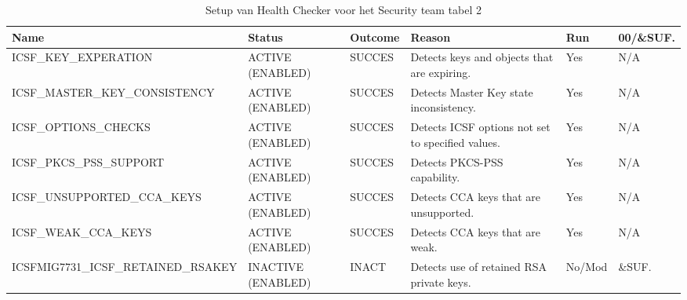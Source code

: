 \begin{landscape}
	\begin{table}[h]
		\begin{tabular}{|l|p{2.3cm}|l|p{4.5cm}|l|l|}
			\hline
			\textbf{Name}                       & \textbf{Status}   & \textbf{Outcome} & \textbf{Reason}    & \textbf{Run} &	\textbf{00/\&SUF.} \\ \hline
			ICSF\_KEY\_EXPERATION               & ACTIVE (ENABLED)   & SUCCES & Detects   keys and objects that are expiring.       & Yes    & N/A    \\ \hline
			ICSF\_MASTER\_KEY\_CONSISTENCY      & ACTIVE (ENABLED)   & SUCCES & Detects   Master Key state inconsistency.           & Yes    & N/A    \\ \hline
			ICSF\_OPTIONS\_CHECKS               & ACTIVE (ENABLED)   & SUCCES & Detects   ICSF options not set to specified values. & Yes    & N/A    \\ \hline
			ICSF\_PKCS\_PSS\_SUPPORT            & ACTIVE (ENABLED)   & SUCCES & Detects   PKCS-PSS capability.                      & Yes    & N/A    \\ \hline
			ICSF\_UNSUPPORTED\_CCA\_KEYS        & ACTIVE (ENABLED)   & SUCCES & Detects   CCA keys that are unsupported.            & Yes    & N/A    \\ \hline
			ICSF\_WEAK\_CCA\_KEYS               & ACTIVE (ENABLED)   & SUCCES & Detects   CCA keys that are weak.                   & Yes    & N/A    \\ \hline
			ICSFMIG7731\_ICSF\_RETAINED\_RSAKEY & INACTIVE (ENABLED) & INACT  & Detects use of retained RSA private keys.           & No/Mod & \&SUF. \\ \hline		
		\end{tabular}
		\caption[Health Checker Security team tabel 2]{Setup van Health Checker voor het Security team tabel 2}
		\label{tbl:Security Team Tabel 2}
	\end{table}
\end{landscape}

